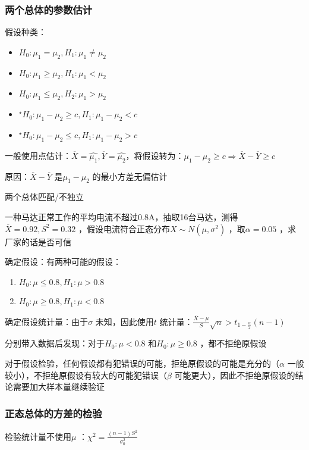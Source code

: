 \subsubsection*{两个总体的参数估计}%
\label{subsub:-两个总体的参数估计}
假设种类：
\begin{itemize}
    \item $H_0:\mu_1=\mu_2,H_1:\mu_1\neq \mu_2$
    \item $H_0:\mu_1\ge \mu_2,H_1:\mu_1<\mu_2$
    \item $H_0:\mu_1\le \mu_2,H_2:\mu_1>\mu_2$
    \item $^\star H_0:\mu_1-\mu_2\ge c,H_1:\mu_1-\mu_2<c$
    \item $^\star H_0:\mu_1-\mu_2\le c,H_1:\mu_1-\mu_2>c$
\end{itemize}
一般使用点估计：$\overline{X}=\hat{\mu_1},\overline{Y}=\hat{\mu_2}$，将假设转为：$\mu_1-\mu_2\ge c\Rightarrow \overline{X}-\overline{Y}\ge c$

原因：$\overline{X}-\overline{Y}$ 是$\mu_1-\mu_2$ 的最小方差无偏估计
\begin{notation}
    两个总体匹配/不独立
\end{notation}
\begin{eg}
    一种马达正常工作的平均电流不超过0.8A，抽取16台马达，测得$\overline{X}=0.92,S^2 =0.32$ ，假设电流符合正态分布$X\sim N\left( \mu,\sigma^2  \right)$ ，取$\alpha=0.05$ ，求厂家的话是否可信
\end{eg}
\begin{sol}
    确定假设：有两种可能的假设：
    \begin{enumerate}
        \item $H_0:\mu\le 0.8,H_1:\mu>0.8$ 
        \item $H_0:\mu\ge 0.8,H_1:\mu<0.8$
    \end{enumerate}
    确定假设统计量：由于$\sigma$ 未知，因此使用$t$ 统计量：$\frac{\overline{X}-\mu}{S}\sqrt{n}>t_{1-\frac{\alpha}{2}}\left( n-1 \right)$

    分别带入数据后发现：对于$H_0:\mu<0.8$ 和$H_0:\mu\ge 0.8$ ，都不拒绝原假设
\end{sol}
\begin{notation}
    对于假设检验，任何假设都有犯错误的可能，拒绝原假设的可能是充分的（$\alpha$ 一般较小），不拒绝原假设有较大的可能犯错误（$\beta$ 可能更大），因此不拒绝原假设的结论需要加大样本量继续验证
\end{notation}
\subsubsection*{正态总体的方差的检验}%
\label{subsub:正态总体的方差的检验}
检验统计量不使用$\mu$ ：$\chi^2 =\frac{\left( n-1 \right)S^2 }{\sigma_0^2 }$

